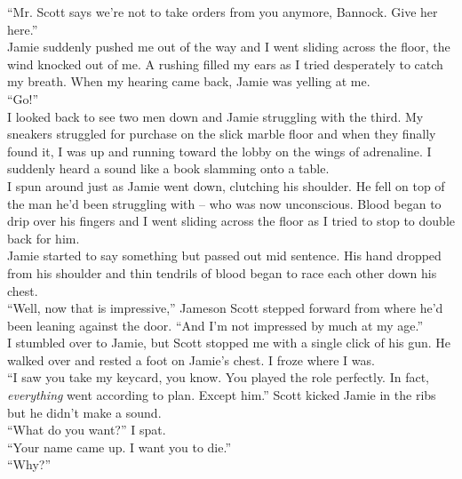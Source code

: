 \documentclass[a5paper]{scrartcl}
\begin{document}
\enquote{Mr. Scott says we're not to take orders from you anymore, Bannock. Give her here.}\\


Jamie suddenly pushed me out of the way and I went sliding across the floor, the wind knocked out of me.  A rushing filled my ears as I tried desperately to catch my breath. When my hearing came back, Jamie was yelling at me.\\


\enquote{Go!}\\


I looked back to see two men down and Jamie struggling with the third. My sneakers struggled for purchase on the slick marble floor and when they finally found it, I was up and running toward the lobby on the wings of adrenaline. I suddenly heard a sound like a book slamming onto a table. \\


I spun around just as Jamie went down, clutching his shoulder. He fell on top of the man he'd been struggling with -- who was now unconscious.   Blood began to drip over his fingers and I went sliding across the floor as I tried to stop to double back for him. \\


Jamie started to say something but passed out mid sentence. His hand dropped from his shoulder and thin tendrils of blood began to race each other down his chest.\\


\enquote{Well, now that is impressive,} Jameson Scott stepped forward from where he'd been leaning against the door. \enquote{And I'm not impressed by much at my age.}\\


I stumbled over to Jamie, but Scott stopped me with a single click of his gun. He walked over and rested a foot on Jamie's chest. I froze where I was. \\


\enquote{I saw you take my keycard, you know. You played the role perfectly. In fact, \textit{everything}
 went according to plan. Except him.} Scott kicked Jamie in the ribs but he didn't make a sound.\\


\enquote{What do you want?} I spat.\\


\enquote{Your name came up. I want you to die.}\\


\enquote{Why?}\\
\end{document}
